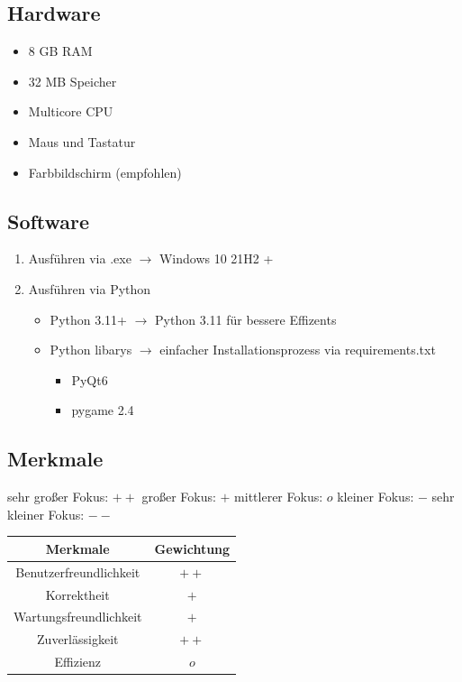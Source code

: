 \documentclass{article}
\begin{document}
\subsection{Hardware}
\begin{itemize}
    \item 8 GB RAM
    \item 32 MB Speicher
    \item Multicore CPU
    \item Maus und Tastatur
    \item Farbbildschirm (empfohlen)
\end{itemize}

\subsection{Software}
\begin{enumerate}
    \item Ausführen via .exe $\rightarrow$ Windows 10 21H2 +
    \item Ausführen via Python
        \begin{itemize}
            \item Python 3.11+ $\rightarrow$ Python 3.11 für bessere Effizents
            \item Python libarys $\rightarrow$ einfacher Installationsprozess via requirements.txt
                \begin{itemize}
                    \item PyQt6
                    \item pygame 2.4
                \end{itemize}
        \end{itemize}
\end{enumerate}

\subsection{Merkmale}
sehr großer Fokus: $++$    großer Fokus: $+$    mittlerer Fokus: $o$    kleiner Fokus: $-$    sehr kleiner Fokus: $--$
\begin{center}
    \begin{tabular}{ |c|c| }
        \hline
        Merkmale & Gewichtung \\
        \hline
        Benutzerfreundlichkeit & $++$ \\
        \hline
        Korrektheit & $+$ \\
        \hline
        Wartungsfreundlichkeit & $+$ \\
        \hline
        Zuverlässigkeit & $++$ \\
        \hline
        Effizienz & $o$ \\
        \hline
    \end{tabular}
\end{center}
\end{document}
